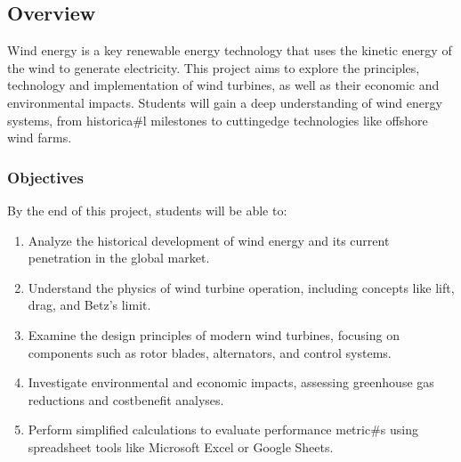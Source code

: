\documentclass[letterpaper,10pt,english]{jupyterBook}
\begin{document}
\subsection{Overview}
\label{\detokenize{ProjectSyllabus:overview}}
\sphinxAtStartPar
Wind energy is a key renewable energy technology that uses the kinetic
energy of the wind to generate electricity. This project aims to explore
the principles, technology and implementation of wind turbines, as well
as their economic and environmental impacts. Students will gain a deep
understanding of wind energy systems, from historica\#l milestones to
cutting\sphinxhyphen{}edge technologies like offshore wind farms.


\subsubsection{Objectives}
\label{\detokenize{ProjectSyllabus:objectives}}
\sphinxAtStartPar
By the end of this project, students will be able to:
\begin{enumerate}
%
\item {} 
\sphinxAtStartPar
Analyze the historical development of wind energy and its current
penetration in the global market.

\item {} 
\sphinxAtStartPar
Understand the physics of wind turbine operation, including concepts
like lift, drag, and Betz’s limit.

\item {} 
\sphinxAtStartPar
Examine the design principles of modern wind turbines, focusing on
components such as rotor blades, alternators, and control systems.

\item {} 
\sphinxAtStartPar
Investigate environmental and economic impacts, assessing greenhouse
gas reductions and cost\sphinxhyphen{}benefit analyses.

\item {} 
\sphinxAtStartPar
Perform simplified calculations to evaluate performance metric\#s
using spreadsheet tools like Microsoft Excel or Google Sheets.

\end{enumerate}
\end{document}
